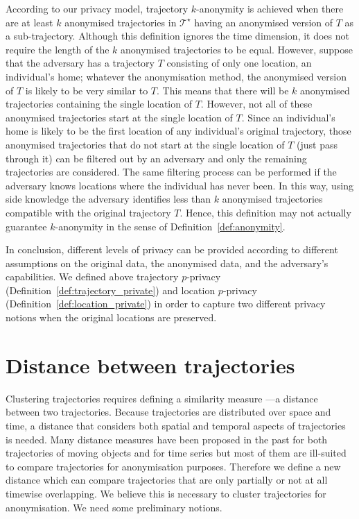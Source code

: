 According to our privacy model, trajectory $k$-anonymity
is achieved when there are at least $k$ anonymised trajectories
in $\mathcal{T}^\star$ having an anonymised version of $T$
as a sub-trajectory. Although this definition ignores the
time dimension, it does not require the length of the $k$
anonymised trajectories to be equal. However, suppose
that the adversary has a trajectory $T$ consisting of only one
location, an individual's home;
whatever the anonymisation method,
the anonymised version of $T$ is likely to be very similar to $T$.
This means that there
will be $k$ anonymised trajectories
containing the single location of $T$.
However, not all of these anonymised
trajectories start at the single location of $T$. Since an individual's home
is likely to be the first location of any individual's original
trajectory, those anonymised trajectories that do not start at the single
location of $T$ (just pass through it) can be filtered out by an adversary
and only the remaining trajectories are considered.
The same filtering process can be performed if the adversary
knows locations where the individual has never been. In this way, using
side knowledge the adversary identifies less than $k$ anonymised
trajectories compatible with the original trajectory $T$.
Hence, this definition may not actually guarantee $k$-anonymity
in the sense of Definition~\ref{def:anonymity}.

In conclusion, different levels of privacy can be provided
according to different assumptions on the
original data, the anonymised data, and the adversary's capabilities.
We defined above trajectory $p$-privacy
(Definition~\ref{def:trajectory_private})
and location $p$-privacy (Definition~\ref{def:location_private})
in order to capture two different privacy notions
when the original locations are preserved.

\section{Distance between trajectories}
\label{sec:distance}

Clustering trajectories requires defining a similarity measure ---a distance
between two trajectories. Because trajectories are distributed over space
and time, a distance that considers both spatial and temporal aspects of
trajectories is needed. Many distance measures have been proposed in the
past for both trajectories of moving objects and for time series but most of them are ill-suited
to compare trajectories for anonymisation purposes.
Therefore we define a new distance which can compare trajectories that are
only partially or not at all timewise overlapping. We believe this is
necessary to cluster trajectories for anonymisation.
We need some preliminary notions.

